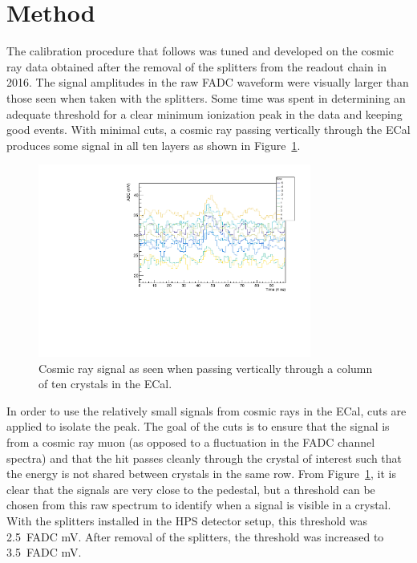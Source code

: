 \documentclass[twoside]{article}
\begin{document}
\section{Method}
The calibration procedure that follows was tuned and developed on the cosmic ray data obtained after the removal of the splitters from the readout chain in 2016. The signal amplitudes in the raw FADC waveform were visually larger than those seen when taken with the splitters. Some time was spent in determining an adequate threshold for a clear minimum ionization peak in the data and keeping good events. With minimal cuts, a cosmic ray passing vertically through the ECal produces some signal in all ten layers as shown in Figure~\ref{rawColumn}.\\
\begin{figure}[htb]
  \centering
      \includegraphics[width=0.8\textwidth]{pics/rayPassingVertically.pdf}
  \caption{Cosmic ray signal as seen when passing vertically through a column of ten crystals in the ECal.}
  \label{rawColumn}
\end{figure}	
In order to use the relatively small signals from cosmic rays in the ECal, cuts are applied to isolate the peak. The goal of the cuts is to ensure that the signal is from a cosmic ray muon (as opposed to a fluctuation in the FADC channel spectra) and that the hit passes cleanly through the crystal of interest such that the energy is not shared between crystals in the same row. From Figure~\ref{rawColumn}, it is clear that the signals are very close to the pedestal, but a threshold can be chosen from this raw spectrum to identify when a signal is visible in a crystal. With the splitters installed in the HPS detector setup, this threshold was 2.5~FADC mV. After removal of the splitters, the threshold was increased to 3.5~FADC mV. \\
\end{document}
